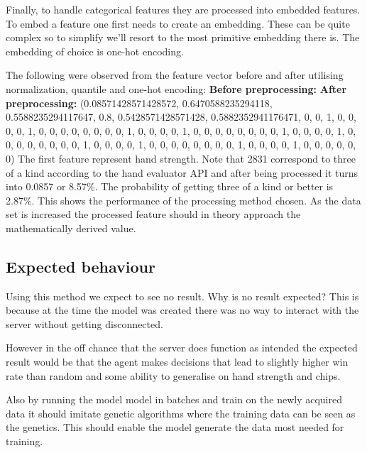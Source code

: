 \documentclass[../main.tex]{subfiles}
\begin{document}
Finally, to handle categorical features they are processed into embedded features. To embed a feature one first needs to create an embedding. These can be quite complex so to simplify we'll resort to the most primitive embedding there is. The embedding of choice is one-hot encoding. 



The following were observed from the feature vector before and after utilising normalization, quantile and one-hot encoding:
\newline\newline
\textbf{Before preprocessing:}
\newline\newline
\textbf{After preprocessing:}\newline
(0.08571428571428572, 0.6470588235294118, 0.5588235294117647, 0.8, 0.5428571428571428, 0.5882352941176471, 0, 0, 1, 0, 0, 0, 0, 1, 0, 0, 0, 0, 0, 0, 0, 0, 1, 0, 0, 0, 0, 1, 0, 0, 0, 0, 0, 0, 0, 0, 1, 0, 0, 0, 0, 1, 0, 0, 0, 0, 0, 0, 0, 0, 1, 0, 0, 0, 0, 1, 0, 0, 0, 0, 0, 0, 0, 0, 1, 0, 0, 0, 0, 1, 0, 0, 0, 0, 0, 0)
\newline\newline
The first feature represent hand strength. Note that 2831 correspond to three of a kind according to the hand evaluator API and after being processed it turns into 0.0857 or 8.57\%. The probability of getting three of a kind or better is 2.87\%. This shows the performance of the processing method chosen. As the data set is increased the processed feature should in theory approach the mathematically derived value.

\subsection{Expected behaviour}
Using this method we expect to see no result. Why is no result expected? This is because at the time the model was created there was no way to interact with the server without getting disconnected.

However in the off chance that the server does function as intended the expected result would be that the agent makes decisions that lead to slightly higher win rate than random and some ability to generalise on hand strength and chips.

Also by running the model model in batches and train on the newly acquired data it should imitate genetic algorithms where the training data can be seen as the genetics. This should enable the model generate the data most needed for training.
\end{document}
